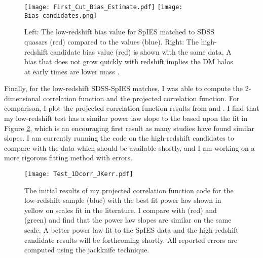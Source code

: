 \documentclass[onecolumn]{emulateapj}
\begin{document}
\begin{figure}[!h]
	\centering
	\texttt{[image: First\_Cut\_Bias\_Estimate.pdf]}
	\texttt{[image: Bias\_candidates.png]}
	\caption{\footnotesize{Left: The low-redshift bias value for SpIES matched to SDSS quasars (red) compared to the \citet{Ross2009} values (blue). Right: The high-redshift candidate bias value (red) is shown with the same \citet{Ross2009} data. A bias that does not grow quickly with redshift implies the DM halos at early times are lower mass \citep{Eftekharzadeh2015}.}}
	\label{plot_bias}
\end{figure}


Finally, for the low-redshift SDSS-SpIES matches, I was able to compute the 2-dimensional correlation function and the projected correlation function. For comparison, I plot the projected correlation function results from \citet{Eftekharzadeh2015} and \citet{Shen2007}. I find that my low-redshift test has a similar power law slope to the \citet{Eftekharzadeh2015} based upon the fit in Figure \ref{wprp}, which is an encouraging first result as many studies have found similar slopes. I am currently running the code on the high-redshift candidates to compare with the \citet{Shen2007} data which should be available shortly, and I am working on a more rigorous fitting method with errors.


\begin{figure}[!h]
	\centering
	\texttt{[image: Test\_1Dcorr\_JKerr.pdf]}
	\caption{\footnotesize{The initial results of my projected correlation function code for the low-redshift sample (blue) with the best fit power law shown in yellow on scales fit in the literature. I compare with \citet{Eftekharzadeh2015} (red) and \citet{Shen2007} (green) and find that the power law slopes are similar on the same scale. A better power law fit to the SpIES data and the high-redshift candidate results will be forthcoming shortly. All reported errors are computed using the jackknife technique. }}
	\label{wprp}
\end{figure}

\clearpage
\end{document}
